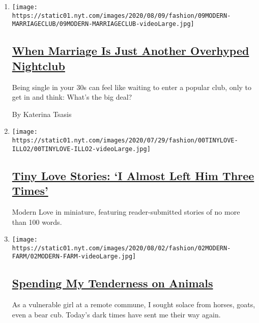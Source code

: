 \begin{enumerate}
\def\labelenumi{\arabic{enumi}.}
\item
  \texttt{[image: https://static01.nyt.com/images/2020/08/09/fashion/09MODERN-MARRIAGECLUB/09MODERN-MARRIAGECLUB-videoLarge.jpg]}

  \hypertarget{when-marriage-is-just-another-overhyped-nightclub}{%
  \subsection{\texorpdfstring{\href{/2020/08/07/style/modern-love-when-marriage-is-just-another-overhyped-nightclub.html}{When
  Marriage Is Just Another Overhyped
  Nightclub}}{When Marriage Is Just Another Overhyped Nightclub}}\label{when-marriage-is-just-another-overhyped-nightclub}}

  Being single in your 30s can feel like waiting to enter a popular
  club, only to get in and think: What's the big deal?

  By Katerina Tsasis
\item
  \texttt{[image: https://static01.nyt.com/images/2020/07/29/fashion/00TINYLOVE-ILLO2/00TINYLOVE-ILLO2-videoLarge.jpg]}

  \hypertarget{tiny-love-stories-i-almost-left-him-three-times}{%
  \subsection{\texorpdfstring{\href{/2020/08/04/style/tiny-modern-love-stories-coronavirus-i-almost-left-him.html}{Tiny
  Love Stories: `I Almost Left Him Three
  Times'}}{Tiny Love Stories: `I Almost Left Him Three Times'}}\label{tiny-love-stories-i-almost-left-him-three-times}}

  Modern Love in miniature, featuring reader-submitted stories of no
  more than 100 words.
\item
  \texttt{[image: https://static01.nyt.com/images/2020/08/02/fashion/02MODERN-FARM/02MODERN-FARM-videoLarge.jpg]}

  \hypertarget{spending-my-tenderness-on-animals}{%
  \subsection{\texorpdfstring{\href{/2020/07/31/style/modern-love-spending-tenderness-on-animals.html}{Spending
  My Tenderness on
  Animals}}{Spending My Tenderness on Animals}}\label{spending-my-tenderness-on-animals}}

  As a vulnerable girl at a remote commune, I sought solace from horses,
  goats, even a bear cub. Today's dark times have sent me their way
  again.


\end{enumerate}
